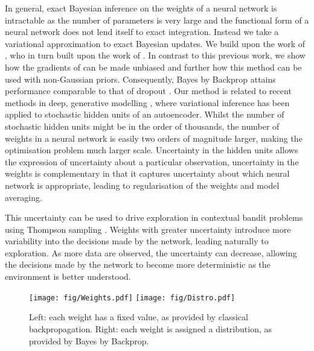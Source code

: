 In general, exact Bayesian inference on the weights of a neural network is intractable as
the number of parameters is very large and the functional form of a neural network does not lend itself
to exact integration.
Instead we take a variational approximation to exact Bayesian updates.
We build upon the work of \citet{graves_practical_2011}, who in turn built upon the work of \citet{hinton_keeping_1993}.
In contrast to this previous work, we show how the gradients of
\citet{graves_practical_2011} can be made unbiased and further how this method
can be used with non-Gaussian priors.
Consequently, Bayes by Backprop attains performance comparable to that of dropout \citep{hinton_dropout_2012}.
Our method is related to recent methods in deep, generative modelling
\citep{kingma_autoencoding_2014, rezende_stochastic_2014, gregor_deep_2014},
where variational inference has been applied to stochastic hidden units of an autoencoder.
Whilst the number of stochastic hidden units might be in the order of
thousands, the number of weights in a neural network is easily two orders of
magnitude larger, making the optimisation problem much larger scale.
Uncertainty in the hidden units allows the expression of uncertainty about a particular observation,
uncertainty in the weights is complementary in that it captures uncertainty
about which neural network is appropriate, leading to regularisation of the
weights and model averaging.

This uncertainty can be used to drive exploration in contextual bandit problems
using Thompson sampling \citep{thompson_likelihood_1933, chapelle_empirical_2011, agrawal_analysis_2012, may_optimistic_2012}.
Weights with greater uncertainty introduce more variability into the decisions made by the network,
leading naturally to exploration.
As more data are observed, the uncertainty can decrease, allowing the decisions made by the network
to become more deterministic as the environment is better understood.

\begin{figure}[t]
\begin{center}
\texttt{[image: fig/Weights.pdf]}
\texttt{[image: fig/Distro.pdf]}
\label{fig:schema}
\caption{Left: each weight has a fixed value, as provided by classical backpropagation. Right: each weight is assigned a distribution, as provided by Bayes by Backprop.}
\end{center}
\end{figure}




